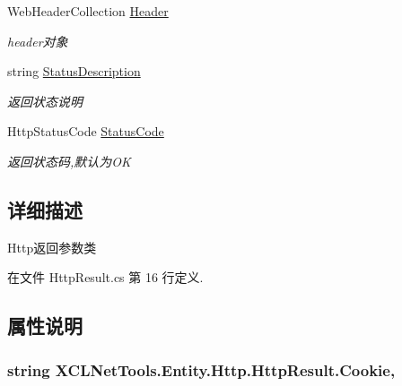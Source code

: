 \begin{DoxyCompactItemize}
Web\-Header\-Collection \hyperlink{class_x_c_l_net_tools_1_1_entity_1_1_http_1_1_http_result_af2f67a87b13cf52358900ff814f88f20}{Header}
\begin{DoxyCompactList}\small\item\em header对象 \end{DoxyCompactList}\item 
string \hyperlink{class_x_c_l_net_tools_1_1_entity_1_1_http_1_1_http_result_ae52de9f66b0248b366ee38cc9eae5659}{Status\-Description}
\begin{DoxyCompactList}\small\item\em 返回状态说明 \end{DoxyCompactList}\item 
Http\-Status\-Code \hyperlink{class_x_c_l_net_tools_1_1_entity_1_1_http_1_1_http_result_afa7d6f65074d0dc74bca65f6e7d79a79}{Status\-Code}
\begin{DoxyCompactList}\small\item\em 返回状态码,默认为\-O\-K \end{DoxyCompactList}\end{DoxyCompactItemize}


\subsection{详细描述}
Http返回参数类 



在文件 Http\-Result.\-cs 第 16 行定义.



\subsection{属性说明}
\hypertarget{class_x_c_l_net_tools_1_1_entity_1_1_http_1_1_http_result_a08219bb78cf5eb91045b344c91e72fad}{
\subsubsection[{Cookie}]{\setlength{\rightskip}{0pt plus 5cm}string X\-C\-L\-Net\-Tools.\-Entity.\-Http.\-Http\-Result.\-Cookie\hspace{0.3cm}{\ttfamily [get]}, {\ttfamily [set]}}}\label{class_x_c_l_net_tools_1_1_entity_1_1_http_1_1_http_result_a08219bb78cf5eb91045b344c91e72fad}


